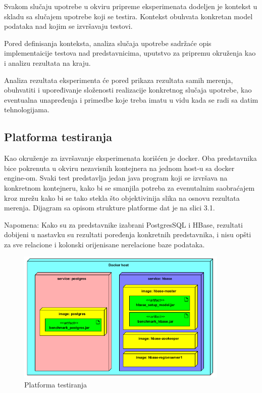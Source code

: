 \documentclass[12pt,oneside]{memoir}
\begin{document}
Svakom slučaju upotrebe u okviru pripreme eksperimenata dodeljen je kontekst u skladu sa slučajem upotrebe koji se testira.  Kontekst obuhvata konkretan model podataka nad kojim se izvršavaju testovi.

Pored definisanja konteksta, analiza slučaja upotrebe sadržaće opis implementaicije testova nad predstavnicima, uputstvo za pripremu okruženja kao i analizu rezultata na kraju.

Analiza rezultata eksperimenta će pored prikaza rezultata samih merenja, obuhvatiti i upoređivanje složenosti realizacije konkretnog slučaja upotrebe, kao eventualna unapređenja i primedbe koje treba imatu u vidu kada se radi sa datim tehnologijama. 

\subsection{Platforma testiranja}

Kao okruženje za izvršavanje eksperimenata korišćen je docker.  Oba predstavnika bice pokrenuta u okviru nezavisnih kontejnera na jednom host-u sa docker engine-om. Svaki test predstavlja jedan java program koji se izvršava na konkretnom kontejneru, kako bi se smanjila potreba za evenutalnim saobraćajem kroz mrežu kako bi se tako stekla što objektivinija slika na osnovu rezultata merenja. Dijagram sa opisom strukture platforme dat je na slici 3.1.


Napomena: Kako su za predstavnike izabrani PostgresSQL i HBase, rezultati dobijeni u nastavku su rezultati poređenja konkretnih predstavnika, i nisu opšti za sve relacione i kolonski orijenisane nerelacione baze podataka.



\begin{figure}[!ht]
  \centering
  \includegraphics[width=0.9\textwidth]{deployment_diagram.png}
  \caption{Platforma testiranja}
  \label{fig:grafikon}
\end{figure}
\end{document}
